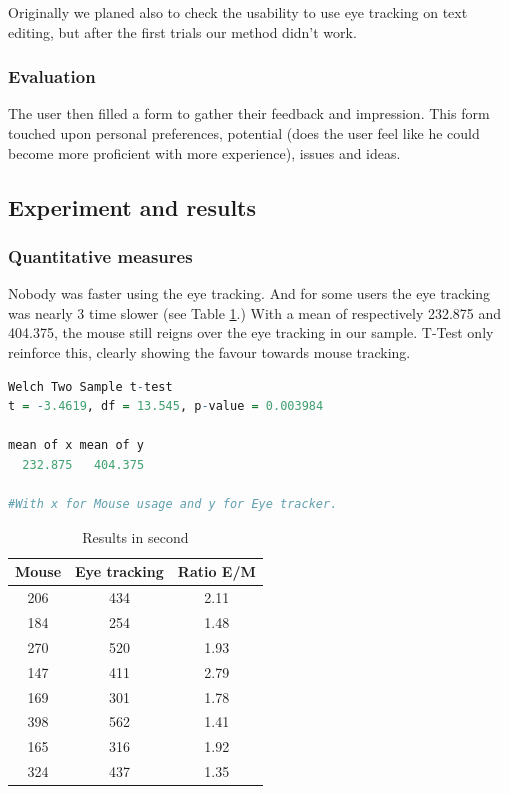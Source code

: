 \documentclass[12pt, a4paper]{article}
\begin{document}
Originally we planed also to check the usability to use eye tracking on text editing, but after the first trials our method didn't work.


\subsubsection{Evaluation}
The user then filled a form to gather their feedback and impression. This form touched upon personal preferences, potential (does the user feel like he could become more proficient with more experience), issues and ideas. 

\subsection{Experiment and results}

\subsubsection{Quantitative measures}
Nobody was faster using the eye tracking. And for some users the eye tracking was nearly 3 time slower (see Table \ref{timetable}.) With a mean of respectively 232.875 and 404.375, the mouse still reigns over the eye tracking in our sample. T-Test only reinforce this, clearly showing the favour towards mouse tracking. 

\begin{lstlisting}[frame=single, language=R]
Welch Two Sample t-test
t = -3.4619, df = 13.545, p-value = 0.003984

mean of x mean of y 
  232.875   404.375 

#With x for Mouse usage and y for Eye tracker.
\end{lstlisting}

\begin{table}
\centering
\begin{tabular}{c|c|c}
Mouse & Eye tracking&Ratio E/M\\
\hline
206&434&2.11\\
184&254&1.48\\
270&520&1.93\\
147&411&2.79\\
169&301&1.78\\
398&562&1.41\\
165&316&1.92\\
324&437&1.35\\
\end{tabular}
\label{timetable}
\caption{Results in second}
\end{table}
\end{document}
